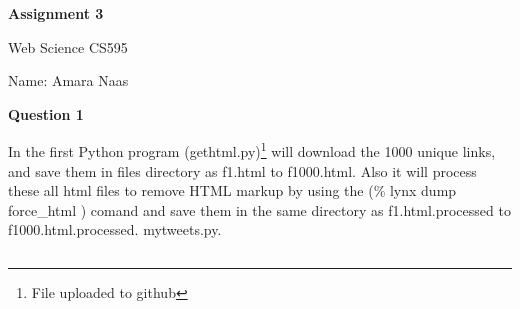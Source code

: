 \documentclass[a4paper,12pt]{article}
\begin{document}
\begin{center}
\begin{Large}


\textbf{Assignment 3}

Web Science CS595

Name: Amara Naas
\end{Large}
\end{center}
\pagebreak

\textbf{Question 1}\par
In the first Python program (gethtml.py)\footnote{File uploaded to github} will download the 1000 unique links, and save them in files directory as f1.html to f1000.html. Also it will process these all html files to remove HTML markup by using the (\% lynx \-dump \-force\_html ) comand and save them in the same directory as f1.html.processed to f1000.html.processed.
mytweets.py\footnotemark[\value{footnote}]. \par

$\:$
\end{document}
